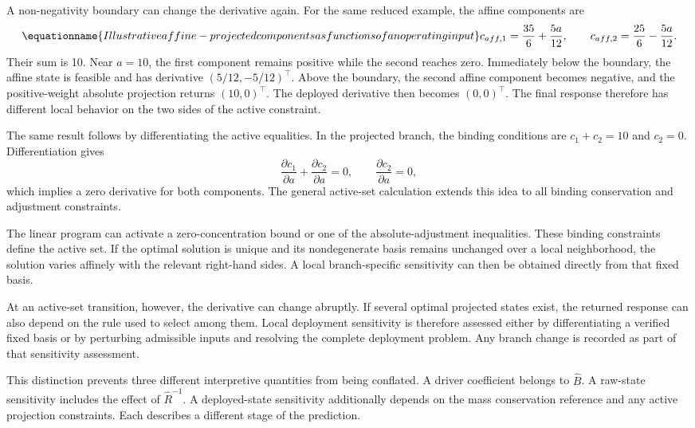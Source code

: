 A non-negativity boundary can change the derivative again. For the same reduced example, the affine components are
\begin{equation}
\equationname{Illustrative affine-projected components as functions of an operating input}
\label{eq:icsor_small_affine_branch}
c_{aff,1}=\frac{35}{6}+\frac{5a}{12},
\qquad
c_{aff,2}=\frac{25}{6}-\frac{5a}{12}.
\end{equation}
Their sum is 10. Near \(a=10\), the first component remains positive while the second reaches zero. Immediately below the boundary, the affine state is feasible and has derivative \((5/12,-5/12)^\top\). Above the boundary, the second affine component becomes negative, and the positive-weight absolute projection returns \((10,0)^\top\). The deployed derivative then becomes \((0,0)^\top\). The final response therefore has different local behavior on the two sides of the active constraint.

The same result follows by differentiating the active equalities. In the projected branch, the binding conditions are \(c_1+c_2=10\) and \(c_2=0\). Differentiation gives
\[
\frac{\partial c_1}{\partial a}+\frac{\partial c_2}{\partial a}=0,
\qquad
\frac{\partial c_2}{\partial a}=0,
\]
which implies a zero derivative for both components. The general active-set calculation extends this idea to all binding conservation and adjustment constraints.

The linear program can activate a zero-concentration bound or one of the absolute-adjustment inequalities. These binding constraints define the active set. If the optimal solution is unique and its nondegenerate basis remains unchanged over a local neighborhood, the solution varies affinely with the relevant right-hand sides. A local branch-specific sensitivity can then be obtained directly from that fixed basis.

At an active-set transition, however, the derivative can change abruptly. If several optimal projected states exist, the returned response can also depend on the rule used to select among them. Local deployment sensitivity is therefore assessed either by differentiating a verified fixed basis or by perturbing admissible inputs and resolving the complete deployment problem. Any branch change is recorded as part of that sensitivity assessment.

This distinction prevents three different interpretive quantities from being conflated. A driver coefficient belongs to \(\widehat B\). A raw-state sensitivity includes the effect of \(\widehat R^{-1}\). A deployed-state sensitivity additionally depends on the mass conservation reference and any active projection constraints. Each describes a different stage of the prediction.


